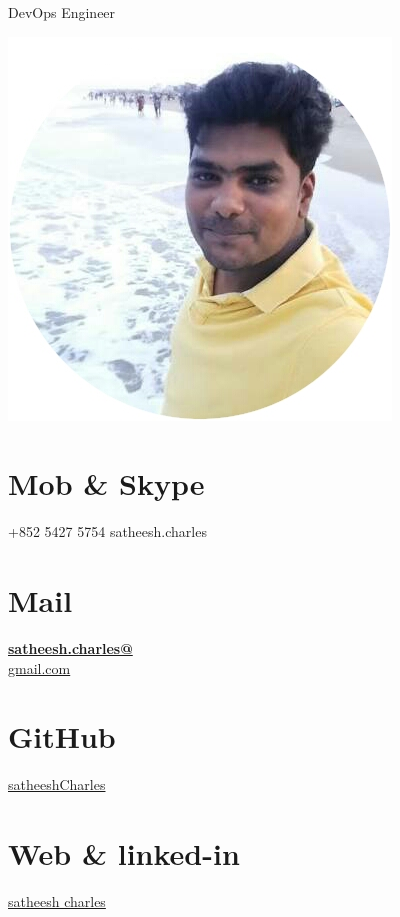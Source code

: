 \documentclass[]{friggeri-cv}
\begin{document}
      {DevOps Engineer}
      

\begin{aside}
  \includegraphics[scale=0.30]{img/Satt.jpg}
  \section{Mob \& Skype}
    +852 5427 5754
    satheesh.charles
    ~
  \section{Mail}
    \href{mailto:satheesh.charles@gmail.com}{\textbf{satheesh.charles@}\\gmail.com}
    ~
    \section{GitHub}
    \href{https://github.com/satheeshCharles}{satheeshCharles}
    ~
  \section{Web \& linked-in}
    \href{https://www.linkedin.com/in/satheesh-charles/}{satheesh charles}
    ~
    ~
    ~

\end{aside}
\end{document}
